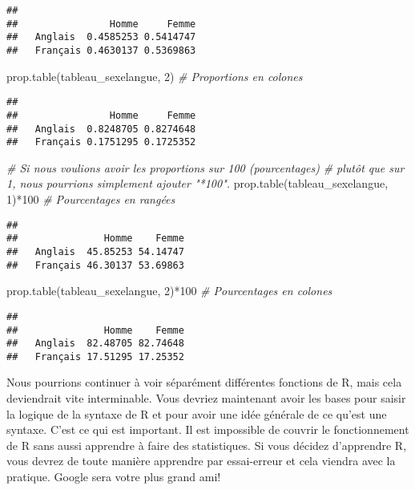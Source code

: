 \documentclass[
]{book}
\newenvironment{Shaded}{\begin{snugshade}}{\end{snugshade}}
\newcommand{\CommentTok}[1]{\textcolor[rgb]{0.56,0.35,0.01}{\textit{#1}}}
\newcommand{\DecValTok}[1]{\textcolor[rgb]{0.00,0.00,0.81}{#1}}
\newcommand{\FunctionTok}[1]{\textcolor[rgb]{0.00,0.00,0.00}{#1}}
\newcommand{\NormalTok}[1]{#1}
\newcommand{\SpecialCharTok}[1]{\textcolor[rgb]{0.00,0.00,0.00}{#1}}
\begin{document}
\begin{verbatim}
##           
##                Homme     Femme
##   Anglais  0.4585253 0.5414747
##   Français 0.4630137 0.5369863
\end{verbatim}

\begin{Shaded}
\begin{Highlighting}[]
\FunctionTok{prop.table}\NormalTok{(tableau\_sexelangue, }\DecValTok{2}\NormalTok{) }\CommentTok{\# Proportions en colones}
\end{Highlighting}
\end{Shaded}

\begin{verbatim}
##           
##                Homme     Femme
##   Anglais  0.8248705 0.8274648
##   Français 0.1751295 0.1725352
\end{verbatim}

\begin{Shaded}
\begin{Highlighting}[]
\CommentTok{\# Si nous voulions avoir les proportions sur 100 (pourcentages)}
\CommentTok{\# plutôt que sur 1, nous pourrions simplement ajouter "*100".}
\FunctionTok{prop.table}\NormalTok{(tableau\_sexelangue, }\DecValTok{1}\NormalTok{)}\SpecialCharTok{*}\DecValTok{100} \CommentTok{\# Pourcentages en rangées}
\end{Highlighting}
\end{Shaded}

\begin{verbatim}
##           
##               Homme    Femme
##   Anglais  45.85253 54.14747
##   Français 46.30137 53.69863
\end{verbatim}

\begin{Shaded}
\begin{Highlighting}[]
\FunctionTok{prop.table}\NormalTok{(tableau\_sexelangue, }\DecValTok{2}\NormalTok{)}\SpecialCharTok{*}\DecValTok{100} \CommentTok{\# Pourcentages en colones}
\end{Highlighting}
\end{Shaded}

\begin{verbatim}
##           
##               Homme    Femme
##   Anglais  82.48705 82.74648
##   Français 17.51295 17.25352
\end{verbatim}

Nous pourrions continuer à voir séparément différentes fonctions de R, mais cela deviendrait vite interminable. Vous devriez maintenant avoir les bases pour saisir la logique de la syntaxe de R et pour avoir une idée générale de ce qu'est une syntaxe. C'est ce qui est important. Il est impossible de couvrir le fonctionnement de R sans aussi apprendre à faire des statistiques. Si vous décidez d'apprendre R, vous devrez de toute manière apprendre par essai-erreur et cela viendra avec la pratique. Google sera votre plus grand ami!
\end{document}
